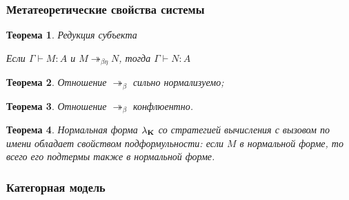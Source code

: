 \documentclass[10pt,pdf,utf8,russian,aspectratio=169]{beamer}
\newtheorem{theor}{Теорема}
\begin{document}
\begin{frame}
  \frametitle{Метатеоретические свойства системы}

  \begin{theor} Редукция субъекта

  Если $\Gamma \vdash M : A$ и $M \twoheadrightarrow_{\beta \eta} N$, тогда $\Gamma \vdash N : A$

  \end{theor}

  \begin{theor}
  Отношение $\twoheadrightarrow_{\beta}$ сильно нормализуемо;
  \end{theor}

  \begin{theor}
  Отношение $\twoheadrightarrow_{\beta}$ конфлюентно.
  \end{theor}

  \begin{theor}
  Нормальная форма $\lambda_{{\bf K}}$ со стратегией вычисления с вызовом по имени обладает свойством подформульности: если $M$ в нормальной форме, то всего его подтермы также в нормальной форме.

  \end{theor}


\end{frame}

\begin{frame}
  \frametitle{Категорная модель}
\end{frame}
\end{document}
